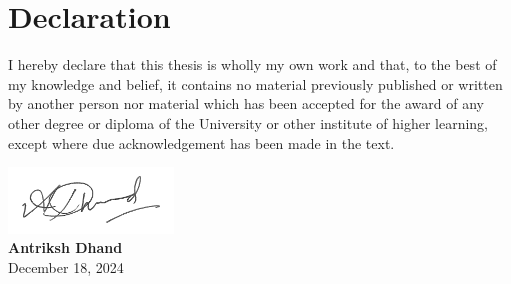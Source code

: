 \chapter*{Declaration}
\thispagestyle{empty}
I hereby declare that this thesis is wholly my own work and that, to the best of my knowledge and belief, it contains no material previously published or written by another person nor material which has been accepted for the award of any other degree or diploma of the University or other institute of higher learning, except where due acknowledgement has been made in the text.

\vfill

\noindent
\includegraphics[width=0.33\textwidth]{img/ch0_frontmatter/signature.pdf}\\[10pt] \noindent\textbf{Antriksh Dhand}\\[7pt]
\noindent December 18, 2024